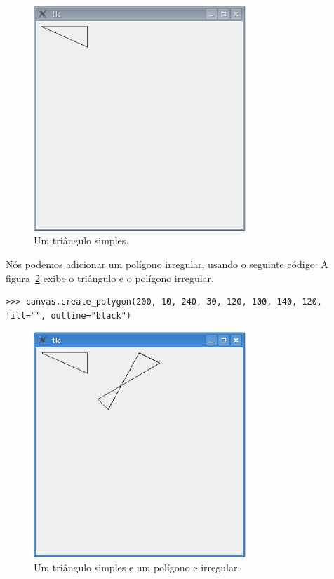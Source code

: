 \begin{figure}
\begin{center}
\includegraphics[width=80mm]{eps/figure41.eps}
\end{center}
\caption{Um triângulo simples.}\label{fig41}
\end{figure}

Nós podemos adicionar um polígono irregular, usando o seguinte código: A figura~\ref{fig42} exibe o triângulo e o polígono irregular.

\begin{listing}
\begin{verbatim}
>>> canvas.create_polygon(200, 10, 240, 30, 120, 100, 140, 120, fill="", outline="black")
\end{verbatim}
\end{listing}

\begin{figure}
\begin{center}
\includegraphics[width=80mm]{eps/figure42.eps}
\end{center}
\caption{Um triângulo simples e um polígono e irregular.}\label{fig42}
\end{figure}

